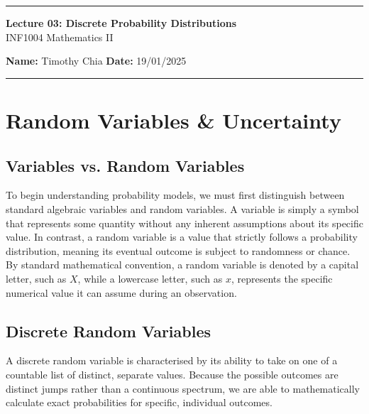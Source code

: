 \documentclass[12pt]{scrartcl}
\begin{document}
\begin{center}
	\hrule
	\vspace{0.4cm}
	{\textbf{\large Lecture 03: Discrete Probability Distributions}}\\ [0.2cm]
	INF1004 Mathematics II

\end{center}

\textbf{Name:} Timothy Chia \hspace{\fill} \textbf{Date:} 19/01/2025 \\

\hrule

\section{Random Variables \& Uncertainty}

\subsection{Variables vs. Random Variables}
To begin understanding probability models, we must first distinguish between standard algebraic variables and random variables. A variable is simply a symbol that represents some quantity without any inherent assumptions about its specific value. In contrast, a random variable is a value that strictly follows a probability distribution, meaning its eventual outcome is subject to randomness or chance. By standard mathematical convention, a random variable is denoted by a capital letter, such as $X$, while a lowercase letter, such as $x$, represents the specific numerical value it can assume during an observation.

\subsection{Discrete Random Variables}
A discrete random variable is characterised by its ability to take on one of a countable list of distinct, separate values. Because the possible outcomes are distinct jumps rather than a continuous spectrum, we are able to mathematically calculate exact probabilities for specific, individual outcomes.
\end{document}
